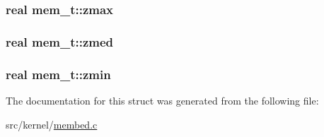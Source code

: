 \hypertarget{structmem__t_a8afccda9fedbd3963e303ac8a84e6bcf}{
\subsubsection[{zmax}]{\setlength{\rightskip}{0pt plus 5cm}real {\bf mem\-\_\-t\-::zmax}}}\label{structmem__t_a8afccda9fedbd3963e303ac8a84e6bcf}
\hypertarget{structmem__t_afa6b1b5a22e9547a3f6775bd8c2c3748}{
\subsubsection[{zmed}]{\setlength{\rightskip}{0pt plus 5cm}real {\bf mem\-\_\-t\-::zmed}}}\label{structmem__t_afa6b1b5a22e9547a3f6775bd8c2c3748}
\hypertarget{structmem__t_a539360191c6d7c304a2dd437142a04a8}{
\subsubsection[{zmin}]{\setlength{\rightskip}{0pt plus 5cm}real {\bf mem\-\_\-t\-::zmin}}}\label{structmem__t_a539360191c6d7c304a2dd437142a04a8}


\-The documentation for this struct was generated from the following file\-:\begin{DoxyCompactItemize}
\item 
src/kernel/\hyperlink{membed_8c}{membed.\-c}\end{DoxyCompactItemize}

